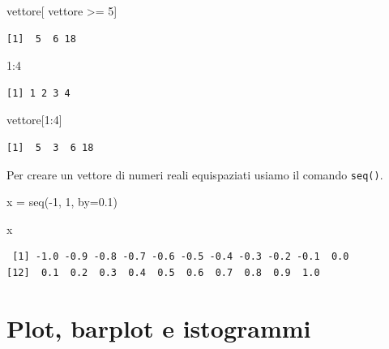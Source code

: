 \documentclass[
  italian,
  letterpaper,
]{book}
\newenvironment{Shaded}{\begin{snugshade}}{\end{snugshade}}
\newcommand{\AttributeTok}[1]{\textcolor[rgb]{0.40,0.45,0.13}{#1}}
\newcommand{\DecValTok}[1]{\textcolor[rgb]{0.68,0.00,0.00}{#1}}
\newcommand{\FloatTok}[1]{\textcolor[rgb]{0.68,0.00,0.00}{#1}}
\newcommand{\FunctionTok}[1]{\textcolor[rgb]{0.28,0.35,0.67}{#1}}
\newcommand{\NormalTok}[1]{\textcolor[rgb]{0.00,0.23,0.31}{#1}}
\newcommand{\OtherTok}[1]{\textcolor[rgb]{0.00,0.23,0.31}{#1}}
\newcommand{\SpecialCharTok}[1]{\textcolor[rgb]{0.37,0.37,0.37}{#1}}
\theoremstyle{definition}
\theoremstyle{remark}
\begin{document}
\begin{Shaded}
\begin{Highlighting}[]
\NormalTok{vettore[ vettore }\SpecialCharTok{\textgreater{}=} \DecValTok{5}\NormalTok{]}
\end{Highlighting}
\end{Shaded}

\begin{verbatim}
[1]  5  6 18
\end{verbatim}

\begin{Shaded}
\begin{Highlighting}[]
\DecValTok{1}\SpecialCharTok{:}\DecValTok{4}
\end{Highlighting}
\end{Shaded}

\begin{verbatim}
[1] 1 2 3 4
\end{verbatim}

\begin{Shaded}
\begin{Highlighting}[]
\NormalTok{vettore[}\DecValTok{1}\SpecialCharTok{:}\DecValTok{4}\NormalTok{]}
\end{Highlighting}
\end{Shaded}

\begin{verbatim}
[1]  5  3  6 18
\end{verbatim}

Per creare un vettore di numeri reali equispaziati usiamo il comando
\texttt{seq()}.

\begin{Shaded}
\begin{Highlighting}[]
\NormalTok{x }\OtherTok{=} \FunctionTok{seq}\NormalTok{(}\SpecialCharTok{{-}}\DecValTok{1}\NormalTok{, }\DecValTok{1}\NormalTok{, }\AttributeTok{by=}\FloatTok{0.1}\NormalTok{)}

\NormalTok{x}
\end{Highlighting}
\end{Shaded}

\begin{verbatim}
 [1] -1.0 -0.9 -0.8 -0.7 -0.6 -0.5 -0.4 -0.3 -0.2 -0.1  0.0
[12]  0.1  0.2  0.3  0.4  0.5  0.6  0.7  0.8  0.9  1.0
\end{verbatim}

\section{Plot, barplot e istogrammi}\label{plot-barplot-e-istogrammi}
\end{document}
